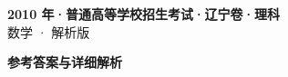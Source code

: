 \documentclass[zihao=-4, a4paper]{ctexart}
\begin{document}
\begin{center}
  {\Large\bfseries 2010 年·普通高等学校招生考试·辽宁卷·理科}\\[4pt]
  {\large 数学 · 解析版}
\end{center}
\medskip
{}

\clearpage
{}
\begin{center}{\Large\bfseries 参考答案与详细解析}\end{center}
\medskip

\end{document}
